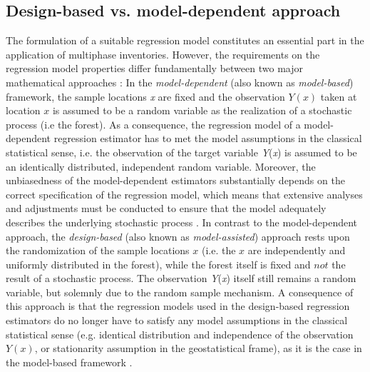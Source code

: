\documentclass[article]{jss}
\begin{document}
\subsection{Design-based vs. model-dependent approach}

The formulation of a suitable regression model constitutes an essential part in the application of multiphase inventories. However, the requirements on the regression model properties differ fundamentally between two major mathematical approaches \cite{mandallaz2008}: In the \textit{model-dependent} (also known as \textit{model-based}) framework, the sample locations \textit{x} are fixed and the observation $Y(x)$ taken at location $x$ is assumed to be a random variable as the realization of a stochastic process (i.e the forest). As a consequence, the regression model of a model-dependent regression estimator has to met the model assumptions in the classical statistical sense, i.e. the observation of the target variable \textit{Y}(\textit{x}) is assumed to be an identically distributed, independent random variable. Moreover, the unbiasedness of the model-dependent estimators substantially depends on the correct specification of the regression model, which means that extensive analyses and adjustments must be conducted to ensure that the model adequately describes the underlying stochastic process \cite{maltamo2014}. In contrast to the model-dependent approach, the \textit{design-based} (also known as \textit{model-assisted}) approach rests upon the randomization of the sample locations $x$ (i.e. the $x$ are independently and uniformly distributed in the forest), while the forest itself is fixed and $not$ the result of a stochastic process. The observation \textit{Y}(\textit{x}) itself still remains a random variable, but solemnly due to the random sample mechanism. A consequence of this approach is that the regression models used in the design-based regression estimators do no longer have to satisfy any model assumptions in the classical statistical sense (e.g. identical distribution and independence of the observation $Y(x)$, or stationarity assumption in the geostatistical frame), as it is the case in the model-based framework \cite{mandallaz2008}.


% 
\end{document}
